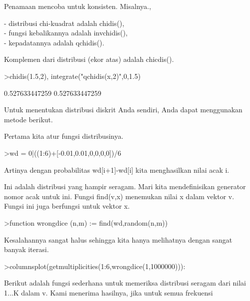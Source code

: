 \documentclass{article}
\begin{document}
\begin{eulernotebook}
\begin{eulercomment}
\begin{eulercomment}
\begin{eulercomment}
Penamaan mencoba untuk konsisten. Misalnya.,

- distribusi chi-kuadrat adalah chidis(),\\
- fungsi kebalikannya adalah invchidis(),\\
- kepadatannya adalah qchidis().

Komplemen dari distribusi (ekor atas) adalah chicdis().
\end{eulercomment}
\begin{eulerprompt}
>chidis(1.5,2), integrate("qchidis(x,2)",0,1.5)
\end{eulerprompt}
\begin{euleroutput}
  0.527633447259
  0.527633447259
\end{euleroutput}
\begin{eulercomment}
Untuk menentukan distribusi diskrit Anda sendiri, Anda dapat
menggunakan metode berikut.

Pertama kita atur fungsi distribusinya.
\end{eulercomment}
\begin{eulerprompt}
>wd = 0|((1:6)+[-0.01,0.01,0,0,0,0])/6
\end{eulerprompt}
\begin{euleroutput}
  [0,  0.165,  0.335,  0.5,  0.666667,  0.833333,  1]
\end{euleroutput}
\begin{eulercomment}
Artinya dengan probabilitas wd[i+1]-wd[i] kita menghasilkan nilai acak
i.

Ini adalah distribusi yang hampir seragam. Mari kita mendefinisikan
generator nomor acak untuk ini. Fungsi find(v,x) menemukan nilai x
dalam vektor v. Fungsi ini juga berfungsi untuk vektor x.
\end{eulercomment}
\begin{eulerprompt}
>function wrongdice (n,m) := find(wd,random(n,m))
\end{eulerprompt}
\begin{eulercomment}
Kesalahannya sangat halus sehingga kita hanya melihatnya dengan sangat
banyak iterasi.
\end{eulercomment}
\begin{eulerprompt}
>columnsplot(getmultiplicities(1:6,wrongdice(1,1000000))):
\end{eulerprompt}
\begin{eulercomment}
Berikut adalah fungsi sederhana untuk memeriksa distribusi seragam
dari nilai 1...K dalam v. Kami menerima hasilnya, jika untuk semua
frekuensi


\end{eulercomment}
\end{eulercomment}
\end{eulercomment}
\end{eulernotebook}
\end{document}

